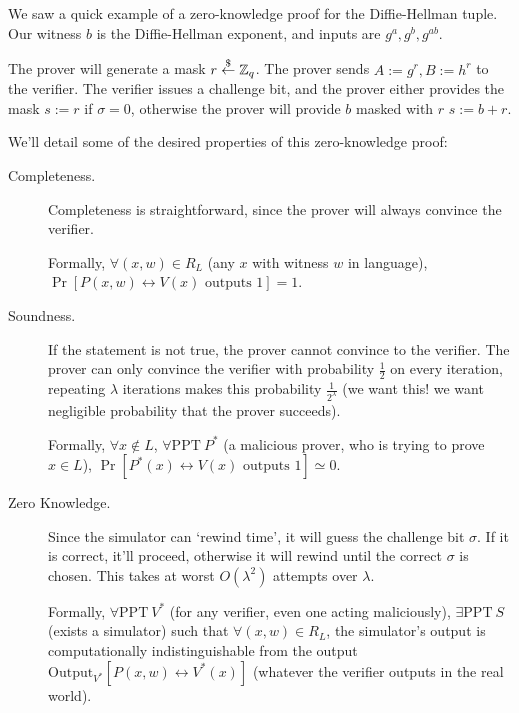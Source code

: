 \begin{example}
    We saw a quick example of a zero-knowledge proof for the Diffie-Hellman tuple. Our witness $b$ is the Diffie-Hellman exponent, and inputs are $g^a, g^b, g^{ab}$.


    The prover will generate a mask $r\overset{\$}{\leftarrow} \mathbb Z_q$. The prover sends $A := g^r, B := h^r$ to the verifier. The verifier issues a challenge bit, and the prover either provides the mask $s:=r$ if $\sigma = 0$, otherwise the prover will provide $b$ masked with $r$ $s:=b + r$.

    We'll detail some of the desired properties of this zero-knowledge proof:
    \begin{description}
        \item[Completeness.] Completeness is straightforward, since the prover will always convince the verifier.

            Formally, $\forall (x, w)\in R_L$ (any $x$ with witness $w$ in language), $\Pr[P(x, w)\leftrightarrow V(x)\text{ outputs }1] = 1$.
        \item[Soundness.] If the statement is not true, the prover cannot convince to the verifier. The prover can only convince the verifier with probability $\frac{1}{2}$ on every iteration, repeating $\lambda$ iterations makes this probability $\frac{1}{2^\lambda}$ (we want this! we want negligible probability that the prover succeeds).

            Formally, $\forall x\not\in L$, $\forall \mathrm{PPT}\ P^*$ (a malicious prover, who is trying to prove $x\in L$), $\Pr[P^*(x)\leftrightarrow V(x)\text{ outputs }1]\simeq 0$.
        \item[Zero Knowledge.] Since the simulator can `rewind time', it will guess the challenge bit $\sigma$. If it is correct, it'll proceed, otherwise it will rewind until the correct $\sigma$ is chosen. This takes at worst $O(\lambda^2)$ attempts over $\lambda$.

            Formally, $\forall \mathrm{PPT}\ V^*$ (for any verifier, even one acting maliciously), $\exists \mathrm{PPT}\ S$ (exists a simulator) such that $\forall (x, w)\in R_L$, the simulator's output is computationally indistinguishable from the output $\mathrm{Output}_{V^*}[P(x, w)\leftrightarrow V^*(x)]$ (whatever the verifier outputs in the real world).
    \end{description}
\end{example}

